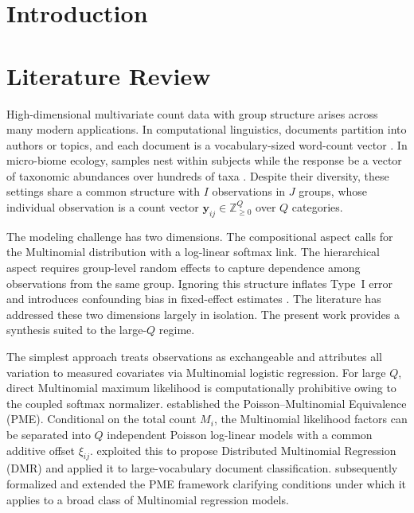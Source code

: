\documentclass[]{report}
\theoremstyle{definition}
\begin{document}
	
\thispagestyle{empty}

\chapter{Introduction}

\chapter{Literature Review}
 
High-dimensional multivariate count data with group structure arises across many modern applications. In computational linguistics, documents partition into authors or topics, and each document is a vocabulary-sized word-count vector \citep{Taddy_2015}. In micro-biome ecology, samples nest within subjects while the response be a vector of taxonomic abundances over hundreds of taxa \citep{Tu2023}. Despite their diversity, these settings share a common structure with $I$ observations in $J$ groups, whose individual observation is a count vector $\bm{y}_{ij} \in \mathbb{Z}^Q_{\geq 0}$ over $Q$ categories.
 
The modeling challenge has two dimensions. The compositional aspect calls for the Multinomial distribution with a log-linear softmax link. The hierarchical aspect requires group-level random effects to capture dependence among observations from the same group. Ignoring this structure inflates Type~I error and introduces confounding bias in fixed-effect estimates \citep{Lee2019AnalysisOG}. The literature has addressed these two dimensions largely in isolation. The present work provides a synthesis suited to the large-$Q$ regime.
 
The simplest approach treats observations as exchangeable and attributes all variation to measured covariates via Multinomial logistic regression. For large $Q$, direct Multinomial maximum likelihood is computationally prohibitive owing to the coupled softmax normalizer. \citet{10.2307/2348134} established the Poisson--Multinomial Equivalence (PME). Conditional on the total count $M_i$, the Multinomial likelihood factors can be separated into $Q$ independent Poisson log-linear models with a common additive offset $\xi_{ij}$. \citet{Taddy_2015} exploited this to propose Distributed Multinomial Regression (DMR) and applied it to large-vocabulary document classification. \citet{lee2017poissontrickextensionsfitting} subsequently formalized and extended the PME framework clarifying conditions under which it applies to a broad class of Multinomial regression models.
 
\end{document}
